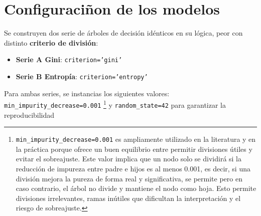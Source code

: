 \documentclass{report}[14pt]
\begin{document}
\section{Configuraciñon de los modelos}
Se construyen dos serie de árboles de decisión idénticos en su lógica, peor con distinto \textbf{criterio de división}:
\begin{itemize}
    \item \textbf{Serie A Gini}: \texttt{criterion='gini'}
    \item \textbf{Serie B Entropía}: \texttt{criterion='entropy'}
\end{itemize}
Para ambas series, se instancias los siguientes valores: \texttt{min\_impurity\_decrease=0.001} \footnote{\texttt{min\_impurity\_decrease=0.001} es ampliamente utilizado en la literatura y en la práctica porque ofrece un buen equilibrio entre permitir divisiones útiles y evitar el sobreajuste. Este valor implica que un nodo solo se dividirá si la reducción de impureza entre padre e hijos es al menos 0.001, es decir, si una división mejora la pureza de forma real y significativa, se permite pero en caso contrario, el árbol no divide y mantiene el nodo como hoja. Esto permite divisiones irrelevantes, ramas inútiles que dificultan la interpretación y el riesgo de sobreajuste.} y \texttt{random\_state=42} para garantizar la reproducibilidad
\end{document}
